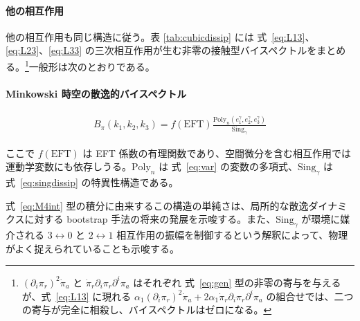 \documentclass[a4paper,11pt]{ltjsarticle}
\numberwithin{equation}{section}
\def\pia{\pi_{a}}
\def\pir{\pi_{r}}
\newcommand{\Eq}[1]{Eq.~(\ref{#1})}
\newcommand{\Eqs}[1]{Eqs.~(\ref{#1})}
\renewcommand{\Eq}[1]{式~\eqref{#1}}
\renewcommand{\Eqs}[1]{式~\eqref{#1}}
\begin{document}
\paragraph{他の相互作用} 他の相互作用も同じ構造に従う。表 \ref{tab:cubicdissip} には \Eqs{eq:L13}、\eqref{eq:L23}、\eqref{eq:L33} の三次相互作用が生む非零の接触型バイスペクトルをまとめる。\footnote{$(\partial_i\pir)^2\dot{\pi}_a$ と $\dot{\pi}_r\partial_i\pir\partial^i\pia$ はそれぞれ \Eq{eq:gen} 型の非零の寄与を与えるが、\Eq{eq:L13} に現れる $\alpha_1(\partial_i\pir)^2\dot{\pi}_a+2\alpha_1\dot{\pi}_r\partial_i\pir\partial^i\pia$ の組合せでは、二つの寄与が完全に相殺し、バイスペクトルはゼロになる。}一般形は次のとおりである。
\begin{tcolorbox}[
enhanced,
breakable,
skin first=enhanced,
skin middle=enhanced,
skin last=enhanced,
before upper={\parindent15pt},
]{}

\paragraph{Minkowski 時空の散逸的バイスペクトル}

\begin{align}\label{eq:gen}
    B_\pi(k_1,k_2,k_3) =f(\mathrm{EFT}) \frac{  \mathrm{Poly}_n\left(e_1^\gamma, e_2^\gamma,e_3^\gamma \right)}{ \mathrm{Sing}_\gamma} 
\end{align}

ここで $f(\mathrm{EFT})$ は EFT 係数の有理関数であり、空間微分を含む相互作用では運動学変数にも依存しうる。$\mathrm{Poly}_n$ は \Eq{eq:var} の変数の多項式、$\mathrm{Sing}_\gamma$ は \Eq{eq:singdissip} の特異性構造である。

\end{tcolorbox}

\Eq{eq:M4int} 型の積分に由来するこの構造の単純さは、局所的な散逸ダイナミクスに対する bootstrap 手法の将来の発展を示唆する。また、$\mathrm{Sing}_\gamma$ が環境に媒介される $3\leftrightarrow0$ と $2\leftrightarrow1$ 相互作用の振幅を制御するという解釈によって、物理がよく捉えられていることも示唆する。
\end{document}
